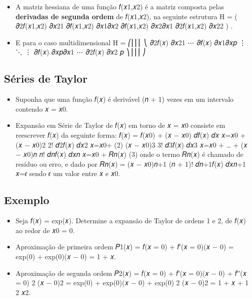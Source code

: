 \documentclass[
]{article}
\providecommand{\tightlist}{%
  \setlength{\itemsep}{0pt}\setlength{\parskip}{0pt}}
\begin{document}
\begin{itemize}
\tightlist
\item
  A matriz hessiana de uma função 𝑓(𝑥1,𝑥2) é a matriz composta pelas
  \textbf{derivadas de segunda ordem} de 𝑓(𝑥1,𝑥2), na seguinte estrutura
  H = ( 𝜕2𝑓(𝑥1,𝑥2) 𝜕𝑥21 𝜕𝑓(𝑥1,𝑥2) 𝜕𝑥1𝜕𝑥2 𝜕𝑓(𝑥1,𝑥2) 𝜕𝑥2𝜕𝑥1 𝜕2𝑓(𝑥1,𝑥2)
  𝜕𝑥22 ) .
\item
  E para o caso multidimensional H = ⎛⎜⎜⎜ ⎝ 𝜕2𝑓(𝑥) 𝜕𝑥21 ⋯ 𝜕𝑓(𝑥) 𝜕𝑥1𝜕𝑥𝑝 ⋮
  ⋱ ⋮ 𝜕𝑓(𝑥) 𝜕𝑥𝑝𝜕𝑥1 ⋯ 𝜕2𝑓(𝑥) 𝜕𝑥2 𝑝 ⎞⎟⎟⎟ ⎠
\end{itemize}

\hypertarget{suxe9ries-de-taylor}{%
\subsection{Séries de Taylor}\label{suxe9ries-de-taylor}}

\begin{itemize}
\tightlist
\item
  Suponha que uma função 𝑓(𝑥) é derivável (𝑛 + 1) vezes em um intervalo
  contendo 𝑥 = 𝑥0.
\item
  Expansão em Série de Taylor de 𝑓(𝑥) em torno de 𝑥 = 𝑥0 consiste em
  reescrever 𝑓(𝑥) da seguinte forma: 𝑓(𝑥) = 𝑓(𝑥0) + (𝑥 − 𝑥0) 𝑑𝑓(𝑥) 𝑑𝑥
  \textbar 𝑥=𝑥0 + (𝑥 − 𝑥0)2 2! 𝑑2𝑓(𝑥) 𝑑𝑥2 \textbar 𝑥=𝑥0+ (2) (𝑥 − 𝑥0)3
  3! 𝑑3𝑓(𝑥) 𝑑𝑥3 \textbar 𝑥=𝑥0 + \ldots{} + (𝑥 − 𝑥0)𝑛 𝑛! 𝑑𝑛𝑓(𝑥) 𝑑𝑥𝑛
  \textbar 𝑥=𝑥0 + 𝑅𝑛(𝑥) (3) onde o termo 𝑅𝑛(𝑥) é chamado de resíduo ou
  erro, e dado por 𝑅𝑛(𝑥) = (𝑥 − 𝑥0)𝑛+1 (𝑛 + 1)! 𝑑𝑛+1𝑓(𝑥) 𝑑𝑥𝑛+1
  \textbar 𝑥=𝜖 sendo 𝜖 um valor entre 𝑥 e 𝑥0.
\end{itemize}

\hypertarget{exemplo-2}{%
\subsection{Exemplo}\label{exemplo-2}}

\begin{itemize}
\tightlist
\item
  Seja 𝑓(𝑥) = exp(𝑥). Determine a expansão de Taylor de ordens 1 e 2, de
  𝑓(𝑥) ao redor de 𝑥0 = 0.
\item
  Aproximação de primeira ordem 𝑃1(𝑥) = 𝑓(𝑥 = 0) + 𝑓′(𝑥 = 0)(𝑥 − 0) =
  exp(0) + exp(0)(𝑥 − 0) = 1 + 𝑥.
\item
  Aproximação de segunda ordem 𝑃2(𝑥) = 𝑓(𝑥 = 0) + 𝑓′(𝑥 = 0)(𝑥 − 0) +
  𝑓′′(𝑥 = 0) 2 (𝑥 − 0)2 = exp(0) + exp(0)(𝑥 − 0) + exp(0) 2 (𝑥 − 0)2 = 1
  + 𝑥 + 1 2 𝑥2.
\end{itemize}
\end{document}
